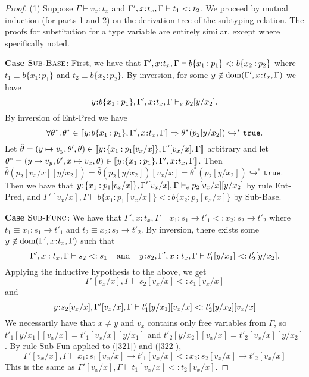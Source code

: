 \documentclass[11pt]{article}
\newcommand{\bind}{\hspace{0.05em}{:}\hspace{0.05em}} %
\newcommand{\col}{\mathbin{:}}       %
\newcommand{\lb}{\llbracket}         %
\newcommand{\rb}{\rrbracket}         %
\newcommand{\many}{\hookrightarrow^*}
\newcommand{\true}{\mathtt{true}}
\newcommand{\dom}[1]{{\rm dom}(#1)}
\begin{document}
\begin{proof}
(1) Suppose $\Gamma \vdash v_x:t_x$ and $\Gamma', x\bind t_x ,\Gamma  \vdash t_1 <: t_2$. We proceed by mutual induction (for parts 1 and 2) on the derivation tree of the subtyping relation. The proofs for substitution for a type variable are entirely similar, except where specifically noted.

{\bf Case} $\textsc{Sub-Base}$: First, we have that 
$\Gamma',x\bind t_x,\Gamma \vdash b\{x_1\col p_1\} <: b\{x_2\col p_2\}$ where $t_1 \equiv b\{x_1\col p_1\}$ and $t_2 \equiv b\{x_2\col p_2\}$.
By inversion, for some $y\not\in\dom{\Gamma',x\bind t_x,\Gamma}$ we have
\[y\bind b\{x_1\col p_1\}, \Gamma',x\bind t_x,\Gamma \vdash_e  p_2[y/x_2].\] 
By inversion of {\sc Ent-Pred} we have 
\begin{equation}\label{311}
\forall\theta^*.\, \theta^* \in \lb y\bind b\{x_1\col p_1\}, \Gamma',x\bind t_x,\Gamma \rb \Rightarrow \theta^*(p_2[y/x_2]) \many \true.
\end{equation}
Let $\hat \theta = (y\mapsto v_y,\theta',\theta) \in \lb y\bind\{x_1\col p_1[v_x/x]\},\Gamma'[v_x/x], \Gamma\rb$ arbitrary and let $\theta^* = (y\mapsto v_y, \theta', x \mapsto v_x, \theta) \in \lb y\bind\{ x_1\col p_1\}, \Gamma', x\bind t_x, \Gamma\rb$.
Then $\hat \theta(p_2[v_x/x][y/x_2]) = \hat\theta(p_2[y/x_2])[v_x/x] = \theta^*(p_2[y/x_2]) \many \true$. Then we have that $y\bind\{x_1\col p_1[v_x/x]\},\Gamma'[v_x/x], \Gamma \vdash_e p_2[v_x/x][y/x_2]$
by rule {\sc Ent-Pred}, and $\Gamma'[v_x/x], \Gamma \vdash b\{x_1\col p_1[v_x/x]\} <: b\{x_2\col p_2[v_x/x]\}$ by {\sc Sub-Base}.

{\bf Case} $\textsc{Sub-Func}$: We have that
$\Gamma', x:t_x,\Gamma \vdash x_1:s_1 \rightarrow t'_1 <: x_2:s_2 \rightarrow t'_2$ where $t_1 \equiv x_1:s_1 \rightarrow t'_1$ and $t_2 \equiv x_2:s_2 \rightarrow t'_2$. By inversion, there exists some $y\not\in\dom{\Gamma',x\bind t_x,\Gamma}$ such that
\[
\Gamma',x:t_x,\Gamma \vdash s_2 <: s_1 \;\;\;\;{\rm and}\;\;\;\;
y\bind s_2, \Gamma',x:t_x,\Gamma \vdash t'_1[y/x_1] <: t'_2[y/x_2].
\]
Applying the inductive hypothesis to the above, we get
\begin{equation}\label{321}
\Gamma'[v_x/x],\Gamma \vdash s_2[v_x/x] <: s_1[v_x/x]
\end{equation} 
and
\begin{equation}\label{322}
y\bind s_2[v_x/x],\Gamma'[v_x/x],\Gamma \vdash t'_1[y/x_1][v_x/x] <: t'_2[y/x_2][v_x/x]
\end{equation}
We necessarily have that $x \neq y$ and $v_x$ contains only free variables from $\Gamma$, so
$t'_1[y/x_1][v_x/x] = t'_1[v_x/x][y/x_1]$ and $t'_2[y/x_2][v_x/x] = t'_2[v_x/x][y/x_2]$.
By rule {\sc Sub-Fun} applied to (\ref{321}) and (\ref{322}),
\[
\Gamma'[v_x/x],\Gamma \vdash x_1:s_1[v_x/x] \rightarrow t'_1[v_x/x] <: x_2:s_2[v_x/x] \rightarrow t'_2[v_x/x]
\]
This is the same as 
$\Gamma'[v_x/x],\Gamma \vdash t_1[v_x/x] <: t_2[v_x/x]$.


\end{proof}
\end{document}
